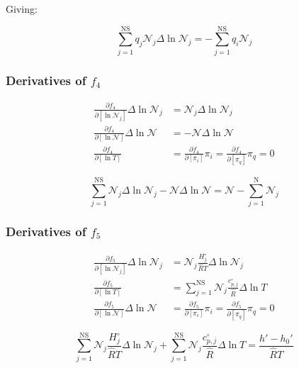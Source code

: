 \documentclass[10pt]{article}
\begin{document}
\begin{flushleft}
Giving:

\begin{equation*}
    \boxed{\sum_{j=1}^\text{NS} q_j \mathcal{N}_j \Delta \ln \mathcal{N}_j = - \sum_{j=1}^\text{NS} q_i \mathcal{N}_j}
\end{equation*}

\subsubsection{Derivatives of $f_4$}

\begin{align}
    \frac{\partial f_4}{\partial [\ln{\mathcal{N}_j}]} \Delta \ln \mathcal{N}_j &= \mathcal{N}_j \Delta \ln \mathcal{N}_j 
    \\ \frac{\partial f_4}{\partial [\ln \mathcal{N}]} \Delta\ln \mathcal{N} &= -\mathcal{N} \Delta \ln \mathcal{N} 
    \\ \frac{\partial f_4}{\partial [\ln T]} &= \frac{\partial f_4}{\partial [\pi_i]} \pi_i = \frac{\partial f_4}{\partial [\pi_q]} \pi_q = 0
\end{align}

\begin{equation}
    \boxed{\sum_{j=1}^\text{NS} \mathcal{N}_j \Delta \ln \mathcal{N}_j - \mathcal{N} \Delta \ln \mathcal{N} = \mathcal{N} - \sum_{j=1}^\text{N} \mathcal{N}_j}
\end{equation}


\subsubsection{Derivatives of $f_5$}

\begin{align}
    \frac{\partial f_5}{\partial [\ln{\mathcal{N}_j}]} \Delta \ln \mathcal{N}_j &= \mathcal{N}_j \frac{H_j^\circ}{\hat{R}T} \Delta \ln \mathcal{N}_j  
    \\ \frac{\partial f_5}{\partial [\ln T]} &=  \sum_{j=1}^\text{NS} \mathcal{N}_j \frac{c_{p,j}^\circ}{\hat{R}} \Delta \ln T
    \\ \frac{\partial f_5}{\partial [\ln \mathcal{N}]} \Delta\ln \mathcal{N} &= \frac{\partial f_5}{\partial [\pi_i]} \pi_i = \frac{\partial f_5}{\partial [\pi_q]} \pi_q = 0
\end{align}

\begin{equation*}
    \boxed{\sum_{j=1}^\text{NS} \mathcal{N}_j \frac{H_j^\circ}{\hat{R}T} \Delta \ln \mathcal{N}_j +  \sum_{j=1}^\text{NS} \mathcal{N}_j \frac{c_{p,j}^\circ}{\hat{R}} \Delta \ln T = \frac{h' - h_0'}{\hat{R}T}}
\end{equation*}


\end{flushleft}
\end{document}

